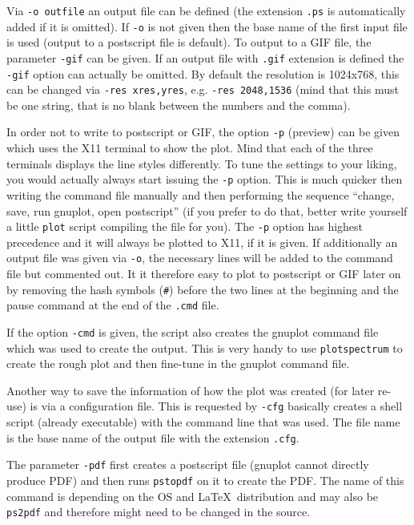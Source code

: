 \documentclass[12pt, a4paper]{article}
\begin{document}
Via \verb'-o outfile' an output file can be defined (the extension \verb'.ps' is automatically added if it is omitted). If \verb'-o' is not given then the base name of the first input file is used (output to a postscript file is default). To output to a GIF file, the parameter \verb'-gif' can be given. If an output file with \verb'.gif' extension is defined the \verb'-gif' option can actually be omitted. By default the resolution is 1024x768, this can be changed via \verb'-res xres,yres', e.g. \verb'-res 2048,1536' (mind that this must be one string, that is no blank between the numbers and the comma).

In order not to write to postscript or GIF, the option \verb'-p' (preview) can be given which uses the X11 terminal to show the plot. Mind that each of the three terminals displays the line styles differently. To tune the settings to your liking, you would actually always start issuing the \verb'-p' option. This is much quicker then writing the command file manually and then performing the sequence ``change, save, run gnuplot, open postscript'' (if you prefer to do that, better write yourself a little \verb'plot' script compiling the file for you). The \verb'-p' option has highest precedence and it will always be plotted to X11, if it is given. If additionally an output file was given via \verb'-o', the necessary lines will be added to the command file but commented out. It it therefore easy to plot to postscript or GIF later on by removing the hash symbols (\verb'#') before the two lines at the beginning and the pause command at the end of the \verb'.cmd' file.

If the option \verb'-cmd' is given, the script also creates the gnuplot command file which was used to create the output. This is very handy to use \verb'plotspectrum' to create the rough plot and then fine-tune in the gnuplot command file.

Another way to save the information of how the plot was created (for later re-use) is via a configuration file. This is requested by \verb'-cfg' basically creates a shell script (already executable) with the command line that was used. The file name is the base name of the output file with the extension \verb'.cfg'.

The parameter \verb'-pdf' first creates a postscript file (gnuplot cannot directly produce PDF) and then runs \verb'pstopdf' on it to create the PDF. The name of this command is depending on the OS and \LaTeX\ distribution and may also be \verb'ps2pdf' and therefore might need to be changed in the source.
\end{document}
